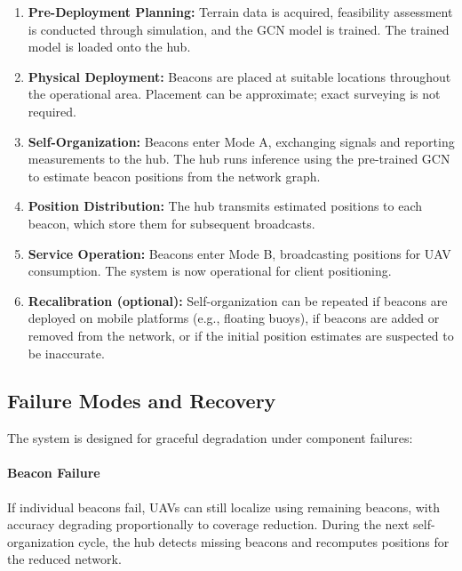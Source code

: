 \documentclass[master,final,11pt]{iscs-thesis}
\begin{document}
\begin{enumerate}
    \item \textbf{Pre-Deployment Planning:} Terrain data is acquired, feasibility assessment is conducted through simulation, and the GCN model is trained. The trained model is loaded onto the hub.
    
    \item \textbf{Physical Deployment:} Beacons are placed at suitable locations throughout the operational area. Placement can be approximate; exact surveying is not required.
    
    \item \textbf{Self-Organization:} Beacons enter Mode A, exchanging signals and reporting measurements to the hub. The hub runs inference using the pre-trained GCN to estimate beacon positions from the network graph.
    
    \item \textbf{Position Distribution:} The hub transmits estimated positions to each beacon, which store them for subsequent broadcasts.
    
    \item \textbf{Service Operation:} Beacons enter Mode B, broadcasting positions for UAV consumption. The system is now operational for client positioning.
    
    \item \textbf{Recalibration (optional):} Self-organization can be repeated if beacons are deployed on mobile platforms (e.g., floating buoys), if beacons are added or removed from the network, or if the initial position estimates are suspected to be inaccurate.
\end{enumerate}

\subsection{Failure Modes and Recovery}

The system is designed for graceful degradation under component failures:

\paragraph{Beacon Failure}
If individual beacons fail, UAVs can still localize using remaining beacons, with accuracy degrading proportionally to coverage reduction.
During the next self-organization cycle, the hub detects missing beacons and recomputes positions for the reduced network.
\end{document}
